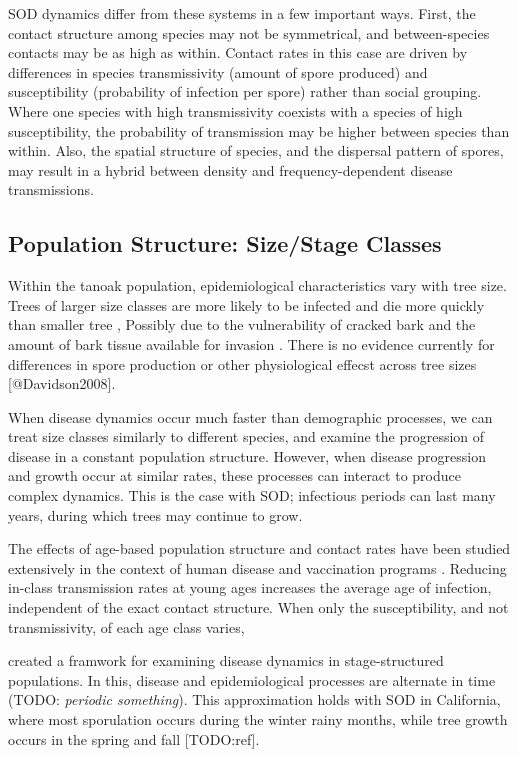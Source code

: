 \documentclass[english,nohyper,nofonts,nobib,nols,twoside]{tufte-handout}
\renewcommand\citep\cite
\let\oldcitet\citet
\renewcommand{\citet}[1]{\oldcitet{#1}\cite{#1}}
\begin{document}
SOD dynamics differ from these systems in a few important ways. First,
the contact structure among species may not be symmetrical, and
between-species contacts may be as high as within. Contact rates in this
case are driven by differences in species transmissivity (amount of
spore produced) and susceptibility (probability of infection per spore)
rather than social grouping. Where one species with high transmissivity
coexists with a species of high susceptibility, the probability of
transmission may be higher between species than within. Also, the
spatial structure of species, and the dispersal pattern of spores, may
result in a hybrid between density and frequency-dependent disease
transmissions.

\subsection{Population Structure: Size/Stage Classes}

Within the tanoak population, epidemiological characteristics vary with
tree size. Trees of larger size classes are more likely to be infected
and die more quickly than smaller tree \citep{Cobb2012}, Possibly due to
the vulnerability of cracked bark and the amount of bark tissue
available for invasion \citep{Swiecki2005}. There is no evidence
currently for differences in spore production or other physiological
effecst across tree sizes {[}@Davidson2008{]}.

When disease dynamics occur much faster than demographic processes, we
can treat size classes similarly to different species, and examine the
progression of disease in a constant population structure. However, when
disease progression and growth occur at similar rates, these processes
can interact to produce complex dynamics. This is the case with SOD;
infectious periods can last many years, during which trees may continue
to grow.

The effects of age-based population structure and contact rates have
been studied extensively in the context of human disease and vaccination
programs \citep[\citet{Metcalf2011}]{Anderson1985}. Reducing in-class
transmission rates at young ages increases the average age of infection,
independent of the exact contact structure. When only the
susceptibility, and not transmissivity, of each age class varies,

\citet{Klepac2010} created a framwork for examining disease dynamics in
stage-structured populations. In this, disease and epidemiological
processes are alternate in time (TODO: \emph{periodic something}). This
approximation holds with SOD in California, where most sporulation
occurs during the winter rainy months, while tree growth occurs in the
spring and fall {[}TODO:ref{]}.
\end{document}

